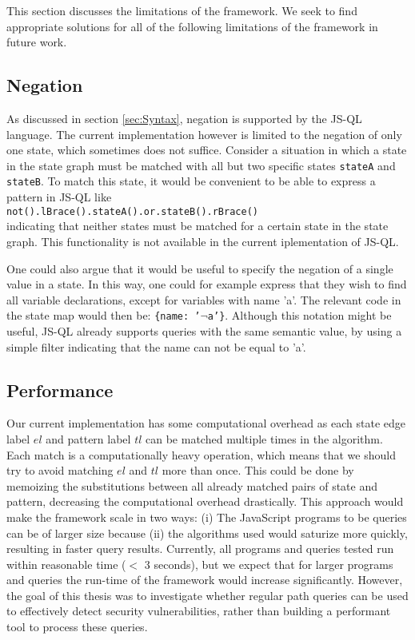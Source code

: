 This section discusses the limitations of the framework. We seek to find appropriate solutions for all of the following limitations of the framework in future work.

\subsection*{Negation}

As discussed in section \ref{sec:Syntax}, negation is supported by the JS-QL language. The current implementation however is limited to the negation of only one state, which sometimes does not suffice. Consider a situation in which a state in the state graph must be matched with all but two specific states \texttt{stateA} and \texttt{stateB}. To match this state, it would be convenient to be able to express a pattern in JS-QL like \\\texttt{not().lBrace().stateA().or.stateB().rBrace()}\\indicating that neither states must be matched for a certain state in the state graph. This functionality is not available in the current iplementation of JS-QL. 

One could also argue that it would be useful to specify the negation of a single value in a state. In this way, one could for example express that they wish to find all variable declarations, except for variables with name 'a'. The relevant code in the state map would then be: \texttt{\{name: '$\neg$a'\}}. Although this notation might be useful, JS-QL already supports queries with the same semantic value, by using a simple filter indicating that the name can not be equal to 'a'.

\subsection*{Performance}

Our current implementation has some computational overhead as each state edge label $el$ and pattern label $tl$ can be matched multiple times in the algorithm. Each match is a computationally heavy operation, which means that we should try to avoid matching $el$ and $tl$ more than once. This could be done by memoizing the substitutions between all already matched pairs of state and pattern, decreasing the computational overhead drastically. This approach would make the framework scale in two ways: (i) The JavaScript programs to be queries can be of larger size because (ii) the algorithms used would saturize more quickly, resulting in faster query results. Currently, all programs and queries tested run within reasonable time ($<$ 3 seconds), but we expect that for larger programs and queries the run-time of the framework would increase significantly. However, the goal of this thesis was to investigate whether regular path queries can be used to effectively detect security vulnerabilities, rather than building a performant tool to process these queries.

